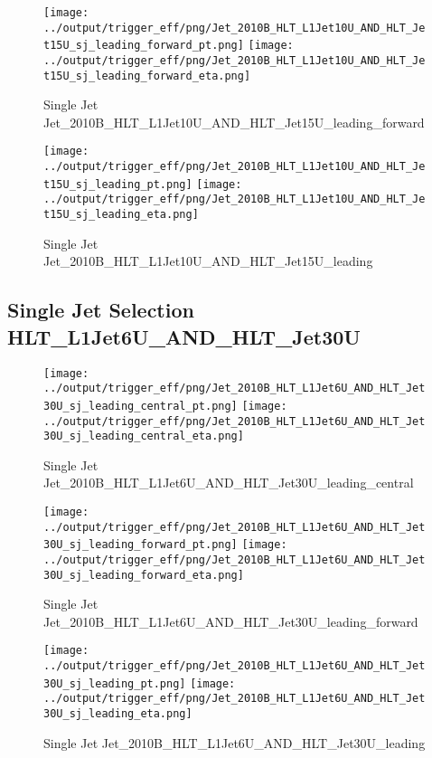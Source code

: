 \documentclass[11pt]{article}
\begin{document}
\begin{figure}[ht]
\centering
\texttt{[image: ../output/trigger\_eff/png/Jet\_2010B\_HLT\_L1Jet10U\_AND\_HLT\_Jet15U\_sj\_leading\_forward\_pt.png]}
\texttt{[image: ../output/trigger\_eff/png/Jet\_2010B\_HLT\_L1Jet10U\_AND\_HLT\_Jet15U\_sj\_leading\_forward\_eta.png]}
\caption{Single Jet Jet\_2010B\_HLT\_L1Jet10U\_AND\_HLT\_Jet15U\_leading\_forward}
\label{fig:jet_sj_L1Jet10U_AND_HLT_Jet15U_leading_forward}
\end{figure}

\begin{figure}[ht]
\centering
\texttt{[image: ../output/trigger\_eff/png/Jet\_2010B\_HLT\_L1Jet10U\_AND\_HLT\_Jet15U\_sj\_leading\_pt.png]}
\texttt{[image: ../output/trigger\_eff/png/Jet\_2010B\_HLT\_L1Jet10U\_AND\_HLT\_Jet15U\_sj\_leading\_eta.png]}
\caption{Single Jet Jet\_2010B\_HLT\_L1Jet10U\_AND\_HLT\_Jet15U\_leading}
\label{fig:jet_sj_L1Jet10U_AND_HLT_Jet15U_leading}
\end{figure}


\newpage
\subsection{Single Jet Selection HLT\_L1Jet6U\_AND\_HLT\_Jet30U}
\begin{figure}[ht]
\centering
\texttt{[image: ../output/trigger\_eff/png/Jet\_2010B\_HLT\_L1Jet6U\_AND\_HLT\_Jet30U\_sj\_leading\_central\_pt.png]}
\texttt{[image: ../output/trigger\_eff/png/Jet\_2010B\_HLT\_L1Jet6U\_AND\_HLT\_Jet30U\_sj\_leading\_central\_eta.png]}
\caption{Single Jet Jet\_2010B\_HLT\_L1Jet6U\_AND\_HLT\_Jet30U\_leading\_central}
\label{fig:jet_sj_L1Jet6U_AND_HLT_Jet30U_leading_central}
\end{figure}

\begin{figure}[ht]
\centering
\texttt{[image: ../output/trigger\_eff/png/Jet\_2010B\_HLT\_L1Jet6U\_AND\_HLT\_Jet30U\_sj\_leading\_forward\_pt.png]}
\texttt{[image: ../output/trigger\_eff/png/Jet\_2010B\_HLT\_L1Jet6U\_AND\_HLT\_Jet30U\_sj\_leading\_forward\_eta.png]}
\caption{Single Jet Jet\_2010B\_HLT\_L1Jet6U\_AND\_HLT\_Jet30U\_leading\_forward}
\label{fig:jet_sj_L1Jet6U_AND_HLT_Jet30U_leading_forward}
\end{figure}

\begin{figure}[ht]
\centering
\texttt{[image: ../output/trigger\_eff/png/Jet\_2010B\_HLT\_L1Jet6U\_AND\_HLT\_Jet30U\_sj\_leading\_pt.png]}
\texttt{[image: ../output/trigger\_eff/png/Jet\_2010B\_HLT\_L1Jet6U\_AND\_HLT\_Jet30U\_sj\_leading\_eta.png]}
\caption{Single Jet Jet\_2010B\_HLT\_L1Jet6U\_AND\_HLT\_Jet30U\_leading}
\label{fig:jet_sj_L1Jet6U_AND_HLT_Jet30U_leading}
\end{figure}
\end{document}
